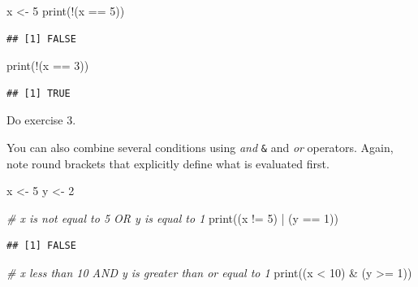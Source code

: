 \documentclass[
]{book}
\newenvironment{Shaded}{\begin{snugshade}}{\end{snugshade}}
\newcommand{\CommentTok}[1]{\textcolor[rgb]{0.56,0.35,0.01}{\textit{#1}}}
\newcommand{\DecValTok}[1]{\textcolor[rgb]{0.00,0.00,0.81}{#1}}
\newcommand{\FunctionTok}[1]{\textcolor[rgb]{0.00,0.00,0.00}{#1}}
\newcommand{\NormalTok}[1]{#1}
\newcommand{\OtherTok}[1]{\textcolor[rgb]{0.56,0.35,0.01}{#1}}
\newcommand{\SpecialCharTok}[1]{\textcolor[rgb]{0.00,0.00,0.00}{#1}}
\begin{document}
\begin{Shaded}
\begin{Highlighting}[]
\NormalTok{x }\OtherTok{\textless{}{-}} \DecValTok{5}
\FunctionTok{print}\NormalTok{(}\SpecialCharTok{!}\NormalTok{(x }\SpecialCharTok{==} \DecValTok{5}\NormalTok{))}
\end{Highlighting}
\end{Shaded}

\begin{verbatim}
## [1] FALSE
\end{verbatim}

\begin{Shaded}
\begin{Highlighting}[]
\FunctionTok{print}\NormalTok{(}\SpecialCharTok{!}\NormalTok{(x }\SpecialCharTok{==} \DecValTok{3}\NormalTok{))}
\end{Highlighting}
\end{Shaded}

\begin{verbatim}
## [1] TRUE
\end{verbatim}

Do exercise 3.

You can also combine several conditions using \emph{and} \texttt{\&} and \emph{or} \texttt{\textbar{}} operators. Again, note round brackets that explicitly define what is evaluated first.

\begin{Shaded}
\begin{Highlighting}[]
\NormalTok{x }\OtherTok{\textless{}{-}} \DecValTok{5}
\NormalTok{y }\OtherTok{\textless{}{-}} \DecValTok{2}

\CommentTok{\# x is not equal to 5 OR y is equal to 1}
\FunctionTok{print}\NormalTok{((x }\SpecialCharTok{!=} \DecValTok{5}\NormalTok{) }\SpecialCharTok{|}\NormalTok{ (y }\SpecialCharTok{==} \DecValTok{1}\NormalTok{))}
\end{Highlighting}
\end{Shaded}

\begin{verbatim}
## [1] FALSE
\end{verbatim}

\begin{Shaded}
\begin{Highlighting}[]
\CommentTok{\# x less than 10 AND y is greater than or equal to 1}
\FunctionTok{print}\NormalTok{((x }\SpecialCharTok{\textless{}} \DecValTok{10}\NormalTok{) }\SpecialCharTok{\&}\NormalTok{ (y }\SpecialCharTok{\textgreater{}=} \DecValTok{1}\NormalTok{))}
\end{Highlighting}
\end{Shaded}
\end{document}
